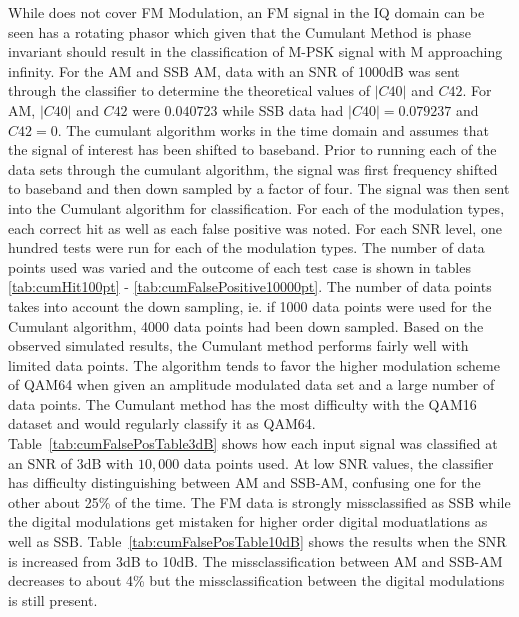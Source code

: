 While \cite{swami2000} does not cover FM Modulation, an FM signal in the IQ
domain can be seen has a rotating phasor which given that the Cumulant Method is
phase invariant should result in the classification of M-PSK signal with M
approaching infinity.  
For the AM and SSB AM, data with an SNR of 1000dB was sent through the
classifier to determine the theoretical values of $|C40|$ and $C42$.  For AM,
$|C40|$ and $C42$ were $0.040723$ while SSB data had $|C40| = 0.079237$ and
$C42 = 0$.
The cumulant algorithm works in the time domain and assumes that the signal of
interest has been shifted to baseband.  Prior to running each of the data sets
through the cumulant algorithm, the signal was first frequency shifted to
baseband and then down sampled by a factor of four.  The signal was then sent
into the Cumulant algorithm for classification.  For each of the modulation
types, each correct hit as well as each false positive was noted.  For each
SNR level, one hundred tests were run for each of the modulation types.  
The number of data points used was varied and the outcome of each test case is
shown in tables \ref{tab:cumHit100pt} - \ref{tab:cumFalsePositive10000pt}.  The
number of data points takes into account the down sampling, ie. if 1000 data
points were used for the Cumulant algorithm, 4000 data points had been down
sampled.
Based on the observed simulated results, the Cumulant method performs fairly
well with limited data points.  The algorithm tends to favor the higher modulation
scheme of QAM64 when given an amplitude modulated data set and a large number of
data points.  The Cumulant method has the most difficulty with the QAM16 dataset
and would regularly classify it as QAM64.
Table~\ref{tab:cumFalsePosTable3dB} shows how each input signal was classified
at an SNR of 3dB with $10,000$ data points used.  At low SNR values, the
classifier has difficulty distinguishing between AM and SSB-AM, confusing one
for the other about 25\% of the time.
The FM data is strongly missclassified as SSB while the digital modulations get
mistaken for higher order digital moduatlations as well as SSB. 
Table~\ref{tab:cumFalsePosTable10dB} shows the results when the SNR is increased
from 3dB to 10dB.  The missclassification between AM and SSB-AM decreases to
about 4\% but the missclassification between the digital modulations is still
present.  

